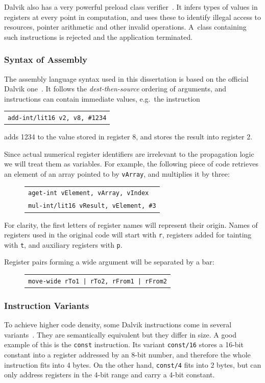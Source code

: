 \documentclass[12pt,twoside,notitlepage]{report}
\newcommand{\centerbox}[1] {
	\begin{center}
	\begin{footnotesize}
	\begin{tabular}{l}
	#1
	\end{tabular}
	\end{footnotesize}
	\end{center}
}
\newcommand{\asm}[1] {\texttt{#1}}
\begin{document}
Dalvik also has a very powerful preload class verifier~\cite{web:DalvikVerifier, web:DalvikDexopt}. It infers types of values in registers at every point in computation, and uses these to identify illegal access to resources, pointer arithmetic and other invalid operations. A~class containing such instructions is rejected and the application terminated.

\subsubsection{Syntax of Assembly}

The assembly language syntax used in this dissertation is based on the official Dalvik one~\cite{web:DalvikBytecode}. It follows the \emph{dest-then-source} ordering of arguments, and instructions can contain immediate values, e.g.\ the instruction
		\centerbox{
			\asm{add-int/lit16 v2, v8, \#1234}
		}
adds 1234 to the value stored in register 8, and stores the result into register 2. 

Since actual numerical register identifiers are irrelevant to the propagation logic we will treat them as variables. For example, the following piece of code retrieves an element of an array pointed to by \verb$vArray$, and multiplies it by three:
	\begin{figure}[H]
		\centerbox{
			\asm{aget-int vElement, vArray, vIndex} \\
			\asm{mul-int/lit16 vResult, vElement, \#3}
		}
	\end{figure}

For clarity, the first letters of register names will represent their origin. Names of registers used in the original code will start with \verb$r$, registers added for tainting with \verb$t$, and auxiliary registers with \verb$p$.

Register pairs forming a wide argument will be separated by a bar:
	\begin{figure}[H]
		\centerbox{
			\asm{move-wide rTo1 | rTo2, rFrom1 | rFrom2}
		}
	\end{figure}

\subsubsection{Instruction Variants}

To achieve higher code density, some Dalvik instructions come in several variants~\cite{web:DalvikBytecode}. They are semantically equivalent but they differ in size. A good example of this is the \verb$const$ instruction. Its variant \verb$const/16$ stores a 16-bit constant into a register addressed by an 8-bit number, and therefore the whole instruction fits into 4 bytes. On the other hand, \verb$const/4$ fits into 2 bytes, but can only address registers in the 4-bit range and carry a 4-bit constant.
\end{document}

